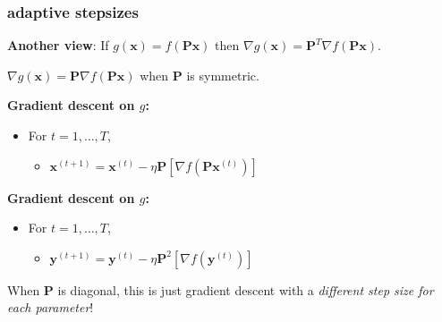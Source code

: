 \documentclass[compress]{beamer}
\newcommand{\bv}[1]{\mathbf{#1}}
\begin{document}


\begin{frame}
	\frametitle{adaptive stepsizes}
	\textbf{Another view}: If $g(\bv{x}) = f(\bv{P}\bv{x})$ then $\nabla g(\bv{x}) = \bv{P}^T\nabla f(\bv{P}\bv{x})$.
	
	 $\nabla g(\bv{x})  = \bv{P}\nabla f(\bv{P}\bv{x})$ when $\bv{P}$ is symmetric. 
	
	\vspace{1em}
	\textbf{Gradient descent on $g$:}
	\begin{itemize}
		\item For $t = 1,\ldots, T$,
		\begin{itemize}
			\item $\bv{x}^{(t+1)} = \bv{x}^{(t)} - \eta\bv{P}\left[\nabla f(\bv{P}\bv{x}^{(t)})\right]$
		\end{itemize}
	\end{itemize}

	\vspace{1em}
	\textbf{Gradient descent on $g$:}
	\begin{itemize}
	\item For $t = 1,\ldots, T$,
	\begin{itemize}
		\item $\bv{y}^{(t+1)} = \bv{y}^{(t)} - \eta\bv{P}^2\left[\nabla f(\bv{y}^{(t)})\right]$
	\end{itemize}
	\end{itemize}
	\begin{center}
		\alert{When $\bv{P}$ is diagonal, this is just gradient descent with a \emph{different step size for each parameter}!}
	\end{center}
\end{frame}
\end{document}
